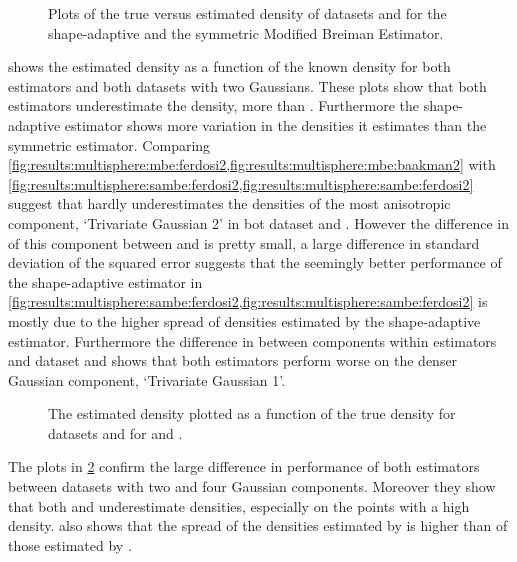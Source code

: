 	\begin{figure}
		\centering
		
		\caption{Plots of the true versus estimated density of datasets \ferdosiTwo and \baakmanTwo for the shape-adaptive and the symmetric Modified Breiman Estimator.}
		\label{fig:results:multiSphere:two:comparativePlots}
	\end{figure}
	 shows the estimated density as a function of the known density for both estimators and both datasets with two Gaussians. These plots show that both estimators underestimate the density, \mbe more than \sambe. Furthermore the shape-adaptive estimator shows more variation in the densities it estimates than the symmetric estimator. 
		Comparing \cref{fig:results:multisphere:mbe:ferdosi2,fig:results:multisphere:mbe:baakman2} with \cref{fig:results:multisphere:sambe:ferdosi2,fig:results:multisphere:sambe:ferdosi2} suggest that \sambe hardly underestimates the densities of the most anisotropic component, \ie `Trivariate Gaussian 2' in bot dataset \ferdosiTwo and \baakmanTwo. However the difference in \mse of this component between \mbe and \sambe is pretty small, a large difference in standard deviation of the squared error suggests that the seemingly better performance of the shape-adaptive estimator in \cref{fig:results:multisphere:sambe:ferdosi2,fig:results:multisphere:sambe:ferdosi2} is mostly due to the higher spread of densities estimated by the shape-adaptive estimator. 
		Furthermore the difference in \mse between components within estimators and dataset \ferdosiTwo and \baakmanTwo shows that both estimators perform worse on the denser Gaussian component, \ie `Trivariate Gaussian 1'.
	\begin{figure}
		\centering
		
		\caption{The estimated density plotted as a function of the true density for datasets \ferdosiThree and \baakmanThree for \mbe and \sambe.}
		\label{fig:results:multiSphere:three:comparativePlots}
	\end{figure}
	The plots in \cref{fig:results:multiSphere:three:comparativePlots} confirm the large difference in performance of both estimators between datasets with two and four Gaussian components. Moreover they show that both \mbe and \sambe underestimate densities, especially on the points with a high density.  also shows that the spread of the densities estimated by \sambe is higher than of those estimated by \mbe. 



